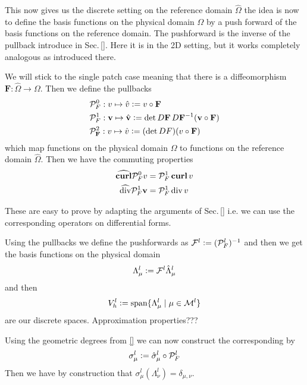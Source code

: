 \documentclass[../master_thesis.tex]{subfiles}
\begin{document}
This now gives us the discrete setting on the reference domain $\hat{\Omega}$ the idea 
is now to define the basis functions on the physical domain $\Omega$ by a 
push forward of the basis functions on the reference domain. 
The pushforward is the inverse of the pullback introduce in Sec.\,\ref{}.
Here it is in the 2D setting, but it works completely analogous as 
introduced there.

We will stick to the single patch case meaning that there is a diffeomorphism 
$\mathbf{F}: \hat{\Omega} \rightarrow \Omega$. Then we define 
the pullbacks 
\begin{align*}
    &\mathcal{P}_F^0: v \mapsto \hat{v} \vcentcolon= v \circ \mathbf{F}
    \\ &\mathcal{P}_F^1: \mathbf{v} \mapsto \hat{\mathbf{v}} 
        \vcentcolon= \det D\mathbf{F} \,D\mathbf{F}^{-1} (\mathbf{v} \circ \mathbf{F})
    \\ &\mathcal{P}_\mathbf{F}^2: v \mapsto \hat{v} \vcentcolon= (\det DF) (v\circ \mathbf{F})
\end{align*}
which map functions on the physical domain $\Omega$ to functions on the reference domain 
$\hat{\Omega}$. Then we have the commuting properties
\begin{align*}
    \widehat{\veccurl} \mathcal{P}_F^0 v &= \mathcal{P}_F^1 \veccurl v
    \\ \widehat{\diver} \mathcal{P}_F^1 \mathbf{v} &= \mathcal{P}_F^1 \diver v
\end{align*}

These are easy to prove by adapting the arguments of Sec.\,\ref{} i.e. we 
can use the corresponding operators on differential forms.

Using the pullbacks we define the pushforwards as 
$\mathcal{F}^l \vcentcolon= (\mathcal{P}_F^l)^{-1}$ and then 
we get the basis functions on the physical domain
\begin{align*}
    \Lambda^l_{\mu} \vcentcolon= \mathcal{F}^l \hat{\Lambda}^l_{\mu}
\end{align*}
and then 
\begin{align*}
    V_h^l \vcentcolon= \text{span} \{ \Lambda^l_{\mu} \mid \mu \in \mathcal{M}^l \}
\end{align*}
are our discrete spaces. {\color{red} Approximation properties???}

Using the geometric degrees from \ref{} we can now construct the corresponding 
by 
\begin{align*}
    \sigma^l_\mu \vcentcolon= \hat{\sigma}_\mu^l \circ \mathcal{P}_F^l
\end{align*}
Then we have by construction that 
$\sigma^l_\mu(\Lambda^l_{\nu}) = \delta_{\mu,\nu}$. 
\end{document}
